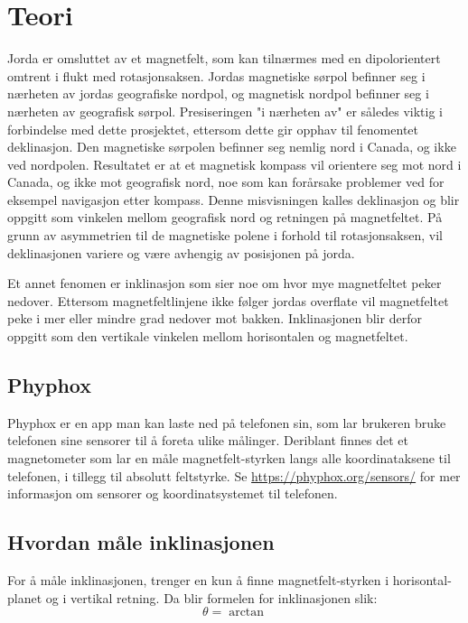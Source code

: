 \section{Teori}
Jorda er omsluttet av et magnetfelt, som kan tilnærmes med en 
dipolorientert omtrent i flukt med rotasjonsaksen. Jordas magnetiske sørpol 
befinner seg i nærheten av jordas geografiske nordpol, og magnetisk nordpol 
befinner seg i nærheten av geografisk sørpol. Presiseringen "i nærheten av" 
er således viktig i forbindelse med dette prosjektet, ettersom dette gir 
opphav til fenomentet deklinasjon. Den magnetiske sørpolen befinner seg 
nemlig nord i Canada, og ikke ved nordpolen. Resultatet er at et magnetisk 
kompass vil orientere seg mot nord i Canada, og ikke mot geografisk nord, 
noe som kan forårsake problemer ved for eksempel navigasjon etter kompass. 
Denne misvisningen kalles deklinasjon og blir oppgitt som vinkelen mellom 
geografisk nord og retningen på magnetfeltet. På grunn av asymmetrien til 
de magnetiske polene i forhold til rotasjonsaksen, vil deklinasjonen 
variere og være avhengig av posisjonen på jorda.

Et annet fenomen er inklinasjon som sier noe om hvor mye magnetfeltet peker 
nedover. Ettersom magnetfeltlinjene ikke følger jordas overflate vil 
magnetfeltet peke i mer eller mindre grad nedover mot bakken. Inklinasjonen 
blir derfor oppgitt som den vertikale vinkelen mellom horisontalen og
magnetfeltet.

\subsection{Phyphox}
Phyphox er en app man kan laste ned på telefonen sin, som lar brukeren 
bruke telefonen sine sensorer til å foreta ulike målinger. Deriblant finnes 
det et magnetometer som lar en måle magnetfelt-styrken langs alle 
koordinataksene til telefonen, i tillegg til absolutt feltstyrke. Se 
\hyperlink{https://phyphox.org/sensors/}{https://phyphox.org/sensors/}
for mer informasjon om sensorer og koordinatsystemet til telefonen.

\subsection{Hvordan måle inklinasjonen}
For å måle inklinasjonen, trenger en kun å finne magnetfelt-styrken i horisontal-
planet og i vertikal retning. Da blir formelen for inklinasjonen slik:
\begin{equation}
    \theta = \arctan
\end{equation}

